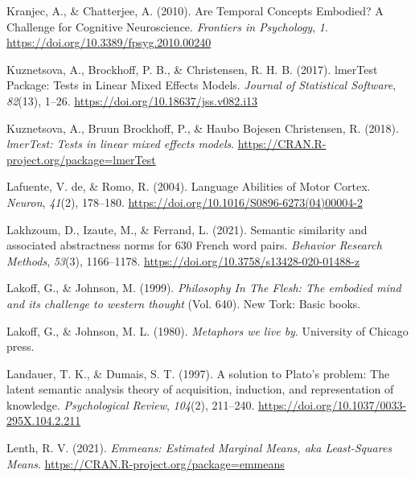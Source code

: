 \documentclass[
  a4paper,12pt,twoside,onecolumn,openright,final,oldfontcommands]{memoir}
\newlength{\cslhangindent}
\newlength{\cslentryspacingunit} %
\newenvironment{CSLReferences}[2] %
 {%
  \setlength{\parindent}{0pt}
  \ifodd #1
  \let\oldpar\par
  \def\par{\hangindent=\cslhangindent\oldpar}
  \fi
  \setlength{\parskip}{#2\cslentryspacingunit}
 }%
 {}
\begin{document}
\begin{CSLReferences}{1}{0}
\leavevmode{}%
Kranjec, A., \& Chatterjee, A. (2010). Are {Temporal} {Concepts} {Embodied}? {A} {Challenge} for {Cognitive} {Neuroscience}. \emph{Frontiers in Psychology}, \emph{1}. \url{https://doi.org/10.3389/fpsyg.2010.00240}

\leavevmode{}%
Kuznetsova, A., Brockhoff, P. B., \& Christensen, R. H. B. (2017). {lmerTest} {Package}: {Tests} in {Linear} {Mixed} {Effects} {Models}. \emph{Journal of Statistical Software}, \emph{82}(13), 1--26. \url{https://doi.org/10.18637/jss.v082.i13}

\leavevmode{}%
Kuznetsova, A., Bruun Brockhoff, P., \& Haubo Bojesen Christensen, R. (2018). \emph{lmerTest: Tests in linear mixed effects models}. \url{https://CRAN.R-project.org/package=lmerTest}

\leavevmode{}%
Lafuente, V. de, \& Romo, R. (2004). Language {Abilities} of {Motor} {Cortex}. \emph{Neuron}, \emph{41}(2), 178--180. \url{https://doi.org/10.1016/S0896-6273(04)00004-2}

\leavevmode{}%
Lakhzoum, D., Izaute, M., \& Ferrand, L. (2021). Semantic similarity and associated abstractness norms for 630 {French} word pairs. \emph{Behavior Research Methods}, \emph{53}(3), 1166--1178. \url{https://doi.org/10.3758/s13428-020-01488-z}

\leavevmode{}%
Lakoff, G., \& Johnson, M. (1999). \emph{Philosophy {In} {The} {Flesh}: {The} embodied mind and its challenge to western thought} (Vol. 640). New Tork: Basic books.

\leavevmode{}%
Lakoff, G., \& Johnson, M. L. (1980). \emph{Metaphors we live by}. University of Chicago press.

\leavevmode{}%
Landauer, T. K., \& Dumais, S. T. (1997). A solution to {Plato}'s problem: {The} latent semantic analysis theory of acquisition, induction, and representation of knowledge. \emph{Psychological Review}, \emph{104}(2), 211--240. \url{https://doi.org/10.1037/0033-295X.104.2.211}

\leavevmode{}%
Lenth, R. V. (2021). \emph{Emmeans: {Estimated} {Marginal} {Means}, aka {Least}-{Squares} {Means}}. \url{https://CRAN.R-project.org/package=emmeans}


\end{CSLReferences}
\end{document}
